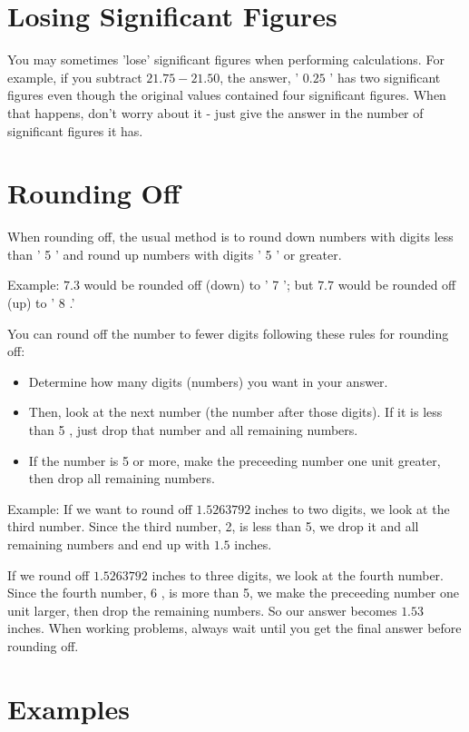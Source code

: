 \begin{enumerate}
\section{Losing Significant Figures}
You may sometimes 'lose' significant figures when performing calculations. For example, if you subtract $21.75-21.50$, the answer, ' $0.25$ ' has two significant figures even though the original values contained four significant figures. When that happens, don't worry about it - just give the answer in the number of significant figures it has.

\section{Rounding Off}
When rounding off, the usual method is to round down numbers with digits less than ' 5 ' and round up numbers with digits ' 5 ' or greater.

Example: $7.3$ would be rounded off (down) to ' 7 '; but $7.7$ would be rounded off (up) to ' 8 .'

You can round off the number to fewer digits following these rules for rounding off:

\begin{itemize}
  \item Determine how many digits (numbers) you want in your answer.

  \item Then, look at the next number (the number after those digits). If it is less than 5 , just drop that number and all remaining numbers.

  \item If the number is 5 or more, make the preceeding number one unit greater, then drop all remaining numbers.

\end{itemize}
Example: If we want to round off $1.5263792$ inches to two digits, we look at the third number. Since the third number, 2, is less than 5, we drop it and all remaining numbers and end up with $1.5$ inches.

If we round off $1.5263792$ inches to three digits, we look at the fourth number. Since the fourth number, 6 , is more than 5, we make the preceeding number one unit larger, then drop the remaining numbers. So our answer becomes $1.53$ inches. When working problems, always wait until you get the final answer before rounding off.

\section{Examples}

\end{enumerate}
